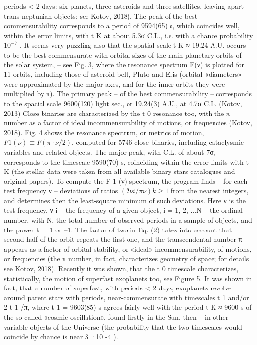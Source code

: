 periods < 2 days: six planets, three asteroids and three satellites, leaving apart trans-neptunian
objects; see Kotov, 2018). The peak of the best commensurability corresponds to a period of
9594(65) s, which coincides well, within the error limits, with t K at about 5.3σ C.L., i.e. with a
chance probability $10^{-7}$ .
It seems very puzzling also that the spatial scale t K ≈ 19.24 A.U. occurs to be the best
commensurate with orbital sizes of the main planetary orbits of the solar system, – see Fig. 3,
where the resonance spectrum F(ν) is plotted for 11 orbits, including those of asteroid belt, Pluto
and Eris (orbital «diameters» were approximated by the major axes, and for the inner orbits they
were multiplied by π). The primary peak – of the best commensurability – corresponds to the
spacial scale 9600(120) light sec., or 19.24(3) A.U., at 4.7σ C.L. (Kotov, 2013)
Close binaries are characterized by the t 0 resonance too, with the π number as a factor of ideal
incommensurability of motions, or frequencies (Kotov, 2018). Fig. 4 shows the resonance spectrum,
or metrics of motion, $F 1 (ν) ≡ F(\pi \cdot ν/2)$, computed for 5746 close binaries, including cataclysmic
variables and related objects. The major peak, with C.L. of about 7σ, corresponds to the timescale
9590(70) s, coinciding within the error limits with t K (the stellar data were taken from all available
binary stars catalogues and original papers).
To compute the F 1 (ν) spectrum, the program finds – for each test frequency ν – deviations of
ratios $(2ν i /\pi ν) k ≥ 1$ from the nearest integers, and determines then the least-square minimum of such
deviations. Here ν is the test frequency, ν i – the frequency of a given object, i = 1, 2, ...N – the
ordinal number, with N, the total number of observed periods in a sample of objects, and the power
k = 1 or –1. The factor of two in Eq. (2) takes into account that second half of the orbit repeats the
first one, and the transcendental number π appears as a factor of orbital stability, or «ideal»
incommensurability, of motions, or frequencies (the π number, in fact, characterizes geometry of
space; for details see Kotov, 2018).
Recently it was shown, that the t 0 timescale characterizes, statistically, the motion of superfast
exoplanets too, see Figure 5.
It was shown in fact, that a number of superfast, with periods < 2 days, exoplanets revolve
around parent stars with periods, near-commensurate with timescales t 1 and/or 2 t 1 /π, where t 1 =
9603(85) s agrees fairly well with the period t K ≈ 9600 s of the so-called «cosmic oscillation», found
firstly in the Sun, then – in other variable objects of the Universe (the probability that the two
timescales would coincide by chance is near 3 ·10 -4 ).

